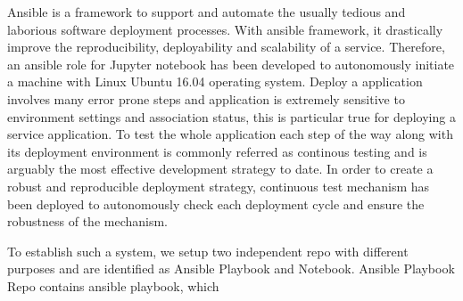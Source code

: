 Ansible is a framework to support and automate the usually tedious and laborious software deployment processes. With ansible framework, it drastically improve the reproducibility, deployability and scalability of a service. Therefore, 
an ansible role for Jupyter notebook has been developed to autonomously initiate a machine with Linux Ubuntu 16.04 operating system. 
Deploy a application involves many error prone steps and application is extremely sensitive to environment settings and association status, this is particular true for deploying a service application. To test the whole application each step of the way along with its deployment environment is commonly referred as continous testing and is arguably the most effective development strategy to date. In order to create a robust and reproducible deployment strategy, continuous test mechanism has been deployed to autonomously check each deployment cycle and ensure the robustness of the mechanism. 

To establish such a system, we setup two independent repo with different purposes and are identified as Ansible Playbook and Notebook.  Ansible Playbook Repo contains ansible playbook, which 